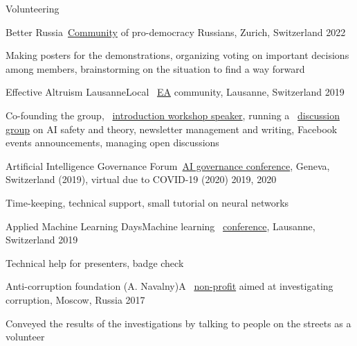 \documentclass{resume} %
\newcommand*{\img}[1]{%
	\raisebox{-.02\baselineskip}{%
		\texttt{[image: \#1]}%
	}%
}
\newcommand*{\emoji}[1]{\img{./emoji/\imgpref#1.png}}
\def\imgpref{bleak-}
\newcommand{\mylink}{{\color{gray}\faExternalLink}}
\begin{document}
\begin{rSection}{Volunteering}
\begin{rSubsection}{Better Russia}{}{\mylink~\href{https://betterrussia.org}{Community} of pro-democracy Russians, Zurich, Switzerland \emoji{flag-ch}}{2022}
	\item[] Making posters for the demonstrations, organizing voting on important decisions among members, brainstorming on the situation to find a way forward
\end{rSubsection}
	
	
\begin{rSubsection}{Effective Altruism Lausanne}{}{Local \mylink~\href{https://effectivealtruism.org}{EA} community, Lausanne, Switzerland \emoji{flag-ch}}{2019}
	\item[] Co-founding the group, \mylink~\href{http://eageneva.org/about#our-members}{introduction workshop speaker}, running a \mylink~\href{https://docs.google.com/document/d/1prejPACr08nUVztHRBc4nj4upKtDc9_EJOYi1alWuYM/edit?usp=sharing}{discussion group} on AI safety and theory, newsletter management and writing, Facebook events announcements, managing open discussions
\end{rSubsection}

\begin{rSubsection}{Artificial Intelligence Governance Forum}{}{\mylink~\href{https://ai-gf.com/}{AI governance conference}, Geneva, Switzerland (2019), virtual due to COVID-19 (2020) \emoji{flag-ch}}{2019, 2020}
	\item[] Time-keeping, technical support, small tutorial on neural networks
\end{rSubsection}

\begin{rSubsection}{Applied Machine Learning Days}{}{Machine learning \mylink~\href{https://www.appliedmldays.org/}{conference}, Lausanne, Switzerland \emoji{flag-ch}}{2019}
\item[]	Technical help for presenters, badge check
\end{rSubsection}
	\begin{rSubsection}{Anti-corruption foundation (A. Navalny)}{}{A \mylink~\href{https://en.wikipedia.org/wiki/Anti-Corruption_Foundation}{non-profit} aimed at investigating corruption, Moscow, Russia \emoji{flag-ru}}{2017}
\item[] Conveyed the results of the investigations by talking to people on the streets as a volunteer
	\end{rSubsection}
\end{rSection}
\end{document}

